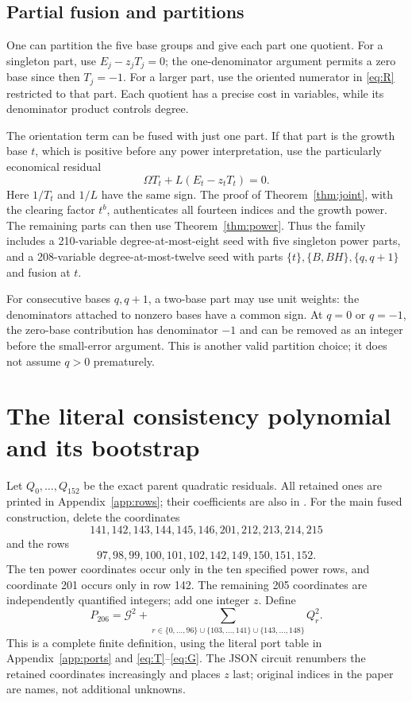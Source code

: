 \documentclass[11pt]{article}
\theoremstyle{definition}\newtheorem{definition}[theorem]{Definition}
\newcommand{\code}[1]{\texttt{\detokenize{#1}}}
\begin{document}
\subsection{Partial fusion and partitions}

One can partition the five base groups and give each part one quotient.
For a singleton part, use $E_j-z_jT_j=0$; the one-denominator argument
permits a zero base since then $T_j=-1$. For a larger part, use the
oriented numerator in \eqref{eq:R} restricted to that part. Each quotient
has a precise cost in variables, while its denominator product controls
degree.

The orientation term can be fused with just one part. If that part is
the growth base $t$, which is positive before any power interpretation,
use the particularly economical residual
\begin{equation}\label{eq:tfusion}
 \Omega T_t+L(E_t-z_tT_t)=0.
\end{equation}
Here $1/T_t$ and $1/L$ have the same sign. The proof of
Theorem~\ref{thm:joint}, with the clearing factor $t^b$, authenticates
all fourteen indices and the growth power. The remaining parts can then
use Theorem~\ref{thm:power}. Thus the family includes a 210-variable
degree-at-most-eight seed with five singleton power parts, and a
208-variable degree-at-most-twelve seed with parts
$\{t\},\{B,BH\},\{q,q+1\}$ and fusion at $t$.

For consecutive bases $q,q+1$, a two-base part may use unit weights:
the denominators attached to nonzero bases have a common sign. At $q=0$ or $q=-1$,
the zero-base contribution has denominator $-1$ and can be removed as
an integer before the small-error argument. This is another valid
partition choice; it does not assume $q>0$ prematurely.

\section{The literal consistency polynomial and its bootstrap}
\label{sec:literal}

Let $Q_0,\ldots,Q_{152}$ be the exact parent quadratic residuals.
All retained ones are printed in Appendix~\ref{app:rows}; their coefficients
are also in \code{source/equation216.json}. For the main fused construction,
delete the coordinates
\[
 141,142,143,144,145,146,201,212,213,214,215
\]
and the rows
\[
 97,98,99,100,101,102,142,149,150,151,152.
\]
The ten power coordinates occur only in the ten specified power rows,
and coordinate 201 occurs only in row 142. The remaining 205 coordinates
are independently quantified integers; add one integer $z$. Define
\begin{equation}\label{eq:P206}
 \boxed{P_{206}=\mathcal G^2+
  \sum_{r\in\{0,\ldots,96\}\cup\{103,\ldots,141\}\cup\{143,\ldots,148\}}
  Q_r^2.}
\end{equation}
This is a complete finite definition, using the literal port table in
Appendix~\ref{app:ports} and \eqref{eq:T}--\eqref{eq:G}.
The JSON circuit renumbers the retained coordinates increasingly and
places $z$ last; original indices in the paper are names, not additional
unknowns.
\end{document}
